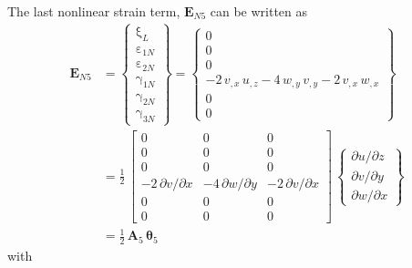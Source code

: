 The last nonlinear strain term, $\mathbf{E}_{N5}$ can be written as
\begin{equation}
	\begin{aligned}
		\mathbf{E}_{N5} & =  \begin{Bmatrix}
			\mathrm \xi_{L} \\
			\mathrm \varepsilon_{1N} \\                    
			\mathrm \varepsilon_{2N} \\           
			\mathrm \gamma_{1N} \\                
			\mathrm \gamma_{2N} \\                
			\mathrm \gamma_{3N} \end{Bmatrix} =   
		\begin{Bmatrix}                       
			0\\
			0   \\
			0  \\
			-2 \, v_{,x} \, u_{,z} - 4 \, w_{,y} \, v_{,y}  - 2 \, v_{,x} \, w_{,x} \\
			0 \\ 
			0 \end{Bmatrix} \\
		& = \frac{1}{2} \, \begin{bmatrix}
			0 & 0 &  0   \\
			0 &  0 & 0  \\
			0 &  0 & 0 \\
			- 2 \, \partial v / \partial x & - 4 \, \partial w / \partial y & - 2 \, \partial v / \partial x  \\
			0 &  0 & 0  \\
			0 &  0 & 0  \end{bmatrix} \, \begin{Bmatrix}
			\partial u / \partial z\\
			\partial v / \partial y \\
			\partial w / \partial x
		\end{Bmatrix} \\
	    &	= \tfrac{1}{2} \, \mathbf{A}_5 \, \boldsymbol{\theta}_5
	\end{aligned}
\end{equation}
with  
